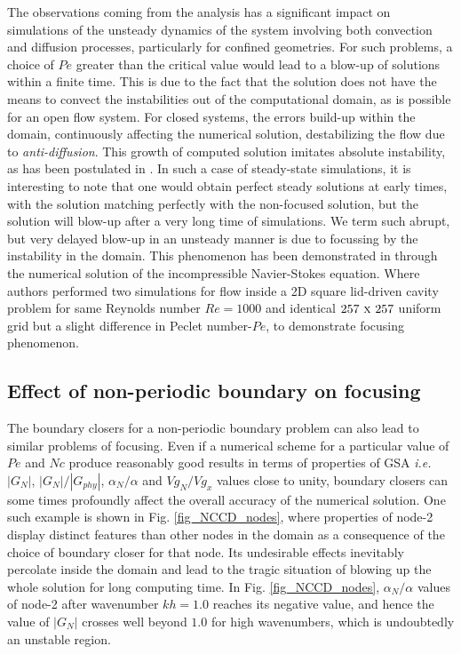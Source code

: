 \documentclass[showpacs,preprintnumbers,amsmath,amssymb]{revtex4-1} %
\begin{document}
The observations coming from the analysis has a significant impact on simulations of the unsteady dynamics of the system involving both convection and diffusion processes, particularly for confined geometries. For such problems, a choice of $Pe$ greater than the critical value would lead to a blow-up of solutions within a finite time. This is due to the fact that the solution does not have the means to convect the instabilities out of the computational domain, as is possible for an open flow system. For closed systems, the errors build-up within the domain, continuously affecting the numerical solution, destabilizing the flow due to \textit{anti-diffusion}. This growth of computed solution imitates absolute instability, as has been postulated in \cite{Cossu_et_al}.  In such a case of steady-state simulations, it is interesting to note that one would obtain perfect steady solutions at early times, with the solution matching perfectly with the non-focused solution, but the solution will blow-up after a very long time of simulations. We term such abrupt, but very delayed blow-up in an unsteady manner is due to focussing by the instability in the domain. This phenomenon has been demonstrated in \cite{pirozzoli2019} through the numerical solution of the incompressible Navier-Stokes equation. Where authors performed two simulations for flow inside a 2D square lid-driven cavity problem for same Reynolds number $Re=1000$ and identical $257\ \textsc{x}\ 257$ uniform grid but a slight difference in Peclet number-$Pe$, to demonstrate focusing phenomenon.

\subsection{Effect of non-periodic boundary on focusing}

The boundary closers for a non-periodic boundary problem can also lead to similar problems of focusing. Even if a numerical scheme for a particular value of $Pe$ and $Nc$ produce reasonably good results in terms of properties of GSA \textit{i.e.} $|G_N|$, $|G_N|/|G_{phy}|$, $\alpha_N/\alpha$ and $Vg_N/Vg_x$ values close to unity, boundary closers can some times profoundly affect the overall accuracy of the numerical solution. One such example is shown in Fig. \ref{fig_NCCD_nodes}, where properties of node-2 display distinct features than other nodes in the domain as a consequence of the choice of boundary closer for that node. Its undesirable effects inevitably percolate inside the domain and lead to the tragic situation of blowing up the whole solution for long computing time. In Fig. \ref{fig_NCCD_nodes}, $\alpha_N/\alpha$ values of node-2 after wavenumber $kh=1.0$ reaches its negative value, and hence the value of $|G_N|$ crosses well beyond $1.0$ for high wavenumbers, which is undoubtedly an unstable region.
\end{document}
